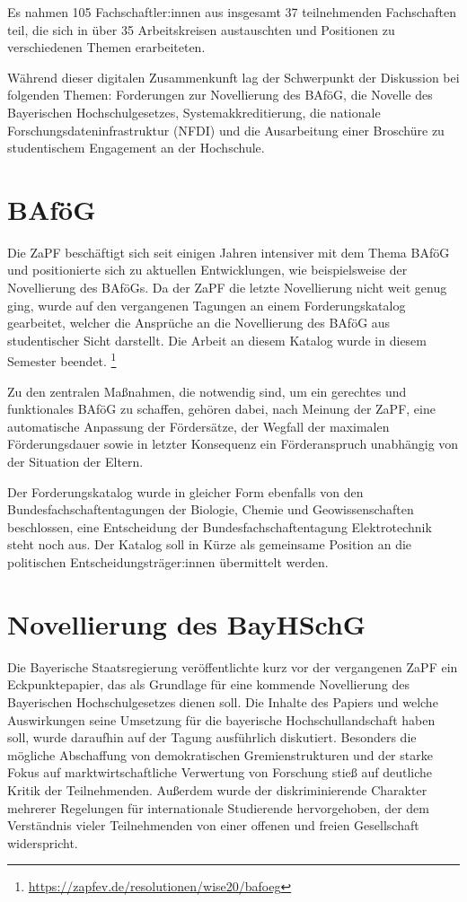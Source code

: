 \documentclass{scrartcl}
\begin{document}
Es nahmen 105 Fachschaftler:innen aus insgesamt 37 teilnehmenden Fachschaften teil, die sich in über 35 Arbeitskreisen austauschten und Positionen zu verschiedenen Themen erarbeiteten.

Während dieser digitalen Zusammenkunft lag der Schwerpunkt der Diskussion bei folgenden Themen: Forderungen zur Novellierung des BAföG, die Novelle des Bayerischen Hochschulgesetzes, Systemakkreditierung, die nationale Forschungsdateninfrastruktur (NFDI) und die Ausarbeitung einer Broschüre zu studentischem Engagement an der Hochschule.

\section*{BAföG}

Die ZaPF beschäftigt sich seit einigen Jahren intensiver mit dem Thema BAföG und positionierte sich zu aktuellen Entwicklungen, wie beispielsweise der Novellierung des BAföGs. Da der ZaPF die letzte Novellierung nicht weit genug ging, wurde auf den vergangenen Tagungen an einem Forderungskatalog gearbeitet, welcher die Ansprüche an die Novellierung des BAföG aus studentischer Sicht darstellt. Die Arbeit an diesem Katalog wurde in diesem Semester beendet. \footnote{\url{https://zapfev.de/resolutionen/wise20/bafoeg}}

Zu den zentralen Maßnahmen, die notwendig sind, um ein gerechtes und funktionales BAföG zu schaffen, gehören dabei, nach Meinung der ZaPF, eine automatische Anpassung der Fördersätze, der Wegfall der maximalen Förderungsdauer sowie in letzter Konsequenz ein Förderanspruch unabhängig von der Situation der Eltern.

Der Forderungskatalog wurde in gleicher Form ebenfalls von den Bundesfachschaftentagungen der Biologie, Chemie und Geowissenschaften beschlossen, eine Entscheidung der Bundesfachschaftentagung Elektrotechnik steht noch aus. Der Katalog soll in Kürze als gemeinsame Position an die politischen Entscheidungsträger:innen übermittelt werden.

\section*{Novellierung des BayHSchG}

Die Bayerische Staatsregierung veröffentlichte kurz vor der vergangenen ZaPF ein Eckpunktepapier, das als Grundlage für eine kommende Novellierung des Bayerischen Hochschulgesetzes dienen soll. Die Inhalte des Papiers und welche Auswirkungen seine Umsetzung für die bayerische Hochschullandschaft haben soll, wurde daraufhin auf der Tagung ausführlich diskutiert. Besonders die mögliche Abschaffung von demokratischen Gremienstrukturen und der starke Fokus auf marktwirtschaftliche Verwertung von Forschung stieß auf deutliche Kritik der Teilnehmenden. Außerdem wurde der diskriminierende Charakter mehrerer Regelungen für internationale Studierende hervorgehoben, der dem Verständnis vieler Teilnehmenden von einer offenen und freien Gesellschaft widerspricht.
\end{document}
